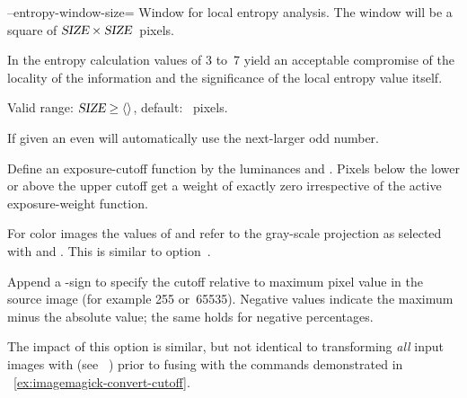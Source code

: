 \begin{codelist}
  \label{opt:entropy-window-size}%
\item[--entropy-window-size=\metavar{SIZE}]\itemend
  Window  for local entropy analysis.  The window will be a square of
  $\textsl{SIZE} \times \textsl{SIZE}$~pixels.

  In the entropy calculation  values of 3 to~7 yield an acceptable compromise of
  the locality of the information and the significance of the local entropy value itself.

  Valid range: $\metavar{SIZE} \geq \val{val:minimum-entropy-window-size}$, default:
  ~pixels.

  If given an even  \App{} will automatically use the next-larger odd number.


  \label{opt:exposure-cutoff}%
\item[\itempar{--exposure-cutoff=\metavar{LOWER-CUTOFF}\optional{:\feasiblebreak
      \metavar{UPPER\hyp{}CUTOFF}\optional{:\feasiblebreak
        \metavar{LOWER\hyp{}PROJECTOR}:\feasiblebreak
        \metavar{UPPER\hyp{}PROJECTOR}}}}]\itemend
  Define an exposure-cutoff function by the luminances  and
  .  Pixels below the lower or above the upper cutoff get a weight of
  exactly zero irrespective of the active exposure-weight function.

  For color images the values of  and  refer to the
  gray-scale projection as selected with  and
  .  This is similar to option~.

  Append a \sample{\%}-sign to specify the cutoff relative to maximum pixel value in the source
  image (for example 255 or~65535).  Negative  values indicate the maximum
  minus the absolute  value; the same holds for negative percentages.

  \begin{geeknote}
    The impact of this option is similar, but not identical to transforming \emph{all} input
    images with 
     (see \appendixName~) prior
    to fusing with the commands demonstrated in
    \exampleName~\ref{ex:imagemagick-convert-cutoff}.


\end{geeknote}
\end{codelist}
